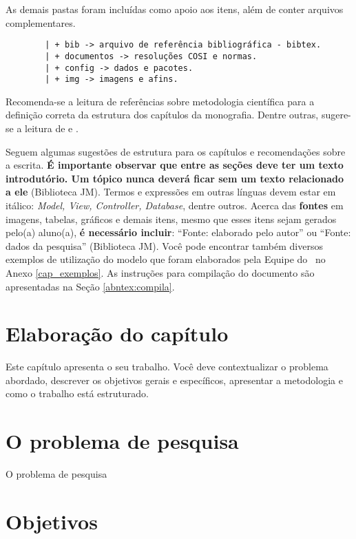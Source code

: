 As demais pastas foram incluídas como apoio aos itens, além de conter arquivos complementares.

\begin{verbatim}
		| + bib -> arquivo de referência bibliográfica - bibtex.
		| + documentos -> resoluções COSI e normas.
		| + config -> dados e pacotes.
		| + img -> imagens e afins.
\end{verbatim}

Recomenda-se a leitura de referências sobre metodologia científica para a definição correta da estrutura dos capítulos da monografia. Dentre outras, sugere-se a leitura de  e .

Seguem algumas sugestões de estrutura para os capítulos e recomendações sobre a escrita. \textbf{É importante observar que entre as seções deve ter um texto introdutório. Um tópico nunca deverá ficar sem um texto relacionado a ele} (Biblioteca JM). Termos e expressões em outras línguas devem estar em itálico: \textit{Model, View, Controller, Database}, dentre outros. Acerca das \textbf{fontes} em imagens, tabelas, gráficos e demais itens, mesmo que esses itens sejam gerados pelo(a) aluno(a), \textbf{é necessário incluir}: ``Fonte: elaborado pelo autor'' ou ``Fonte: dados da pesquisa'' (Biblioteca JM). Você pode encontrar também diversos exemplos de utilização do modelo que foram elaborados pela Equipe do \abnTeX\ no Anexo \ref{cap_exemplos}. As instruções para compilação do documento são apresentadas na Seção \ref{abntex:compila}.


\section{Elaboração do capítulo}

Este capítulo apresenta o seu trabalho. Você deve contextualizar o problema abordado, descrever os objetivos gerais e específicos, apresentar a metodologia e como o trabalho está estruturado.

\section{O problema de pesquisa}
\label{sec:problema}

O problema de pesquisa

\section{Objetivos}
\label{sec:objetivos}

